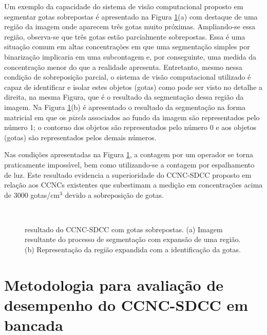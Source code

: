 Um exemplo da capacidade do sistema de vis\~{a}o computacional proposto em segmentar gotas sobrepostas \'{e} apresentado na Figura \ref{detseg}(a)  com destaque de uma regi\~{a}o da imagem onde aparecem tr\^{e}s gotas muito pr\'{o}ximas. Ampliando-se essa regi\~{a}o, observa-se que tr\^{e}s gotas est\~{a}o parcialmente sobrepostas. Essa \'{e} uma situa\c{c}\~{a}o comum em altas concentra\c{c}\~{o}es em que uma segmenta\c{c}\~{a}o simples por binariza\c{c}\~{a}o implicaria em uma subcontagem e, por conseguinte, uma medida da concentra\c{c}\~{a}o menor do que a realidade apresenta. Entretanto, mesmo nessa condi\c{c}\~{a}o de sobreposi\c{c}\~{a}o parcial, o sistema de vis\~{a}o computacional utilizado  \'{e} capaz de identificar e isolar estes objetos (gotas) como pode ser visto no detalhe a direita, na mesma Figura, que \'{e} o resultado da segmenta\c{c}\~{a}o dessa regi\~{a}o da imagem. Na Figura \ref{detseg}(b) \'{e} apresentado o resultado da segmenta\c{c}\~{a}o na forma matricial em que os \emph{pixels} associados ao fundo da imagem s\~{a}o representados pelo n\'{u}mero 1; o contorno dos objetos s\~{a}o representados pelo n\'{u}mero 0 e  aos objetos (gotas) s\~{a}o representados pelos demais n\'{u}meros.

Nas condi\c{c}\~{o}es apresentadas na Figura \ref{detseg}, a contagem por um operador se torna praticamente imposs\'{\i}vel, bem como utilizando-se a contagem por espalhamento de luz. Este resultado evidencia a superioridade do CCNC-SDCC proposto em rela\c{c}\~{a}o aos CCNCs existentes que subestimam a medi\c{c}\~{a}o em concentra\c{c}\~{o}es acima de 3000 gotas/cm$^3$ \cite{Rose} devido a sobreposi\c{c}\~{a}o de gotas.



\begin{figure}[!htbp]%
\centering
{} \\
\centering \caption{resultado do CCNC-SDCC com gotas sobrepostas. (a) Imagem resultante do processo de segmenta\c{c}\~{a}o com expans\~{a}o de uma regi\~{a}o. (b) Representa\c{c}\~{a}o da regi\~{a}o expandida com a identifica\c{c}\~{a}o da gotas.}
\label{detseg}
\end{figure}




\section{Metodologia para avalia\c{c}\~{a}o de desempenho do CCNC-SDCC em bancada}

